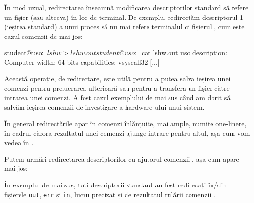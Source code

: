 În mod uzual, redirectarea înseamnă modificarea descriptorilor standard să
refere un fișier (sau altceva) în loc de terminal. De exemplu, redirectăm
descriptorul 1 (ieșirea standard) a unui proces să nu mai refere terminalul ci
fișierul , cum este cazul comenzii de mai jos:

\begin{screen}
student@uso:~$ lshw > lshw.out
student@uso:~$ cat lshw.out
uso
    description: Computer
    width: 64 bits
    capabilities: vsyscall32
[...]
\end{screen}

Această operație, de redirectare, este utilă pentru a putea salva ieșirea unei
comenzi pentru prelucrarea ulterioară sau pentru a transfera un fișier către
intrarea unei comenzi. A fost cazul exemplului de mai sus când am dorit să
salvăm ieșirea comenzii de investigare a hardware-ului unui sistem.

În general redirectările apar în comenzi înlănțuite, mai ample, numite
one-linere, în cadrul cărora rezultatul unei comenzi ajunge intrare pentru
altul, așa cum vom vedea în
.

Putem urmări redirectarea descriptorilor cu ajutorul comenzii , așa cum
apare mai jos:


În exemplul de mai sus, toți descriptorii standard au fost redirecați în/din fișierele \texttt{out}, \texttt{err} și \texttt{in}, lucru precizat și de rezultatul rulării comenzii .

